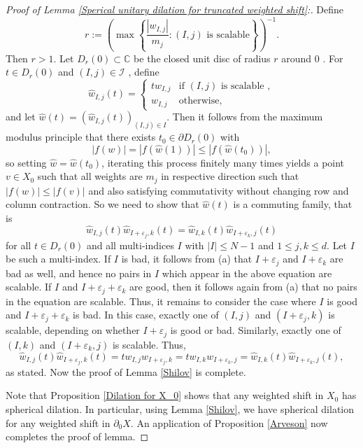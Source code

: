 \documentclass[10pt,a4paper]{amsart}
\begin{document}
\begin{proof}[Proof of Lemma \ref{Sperical unitary dilation for truncated weighted shift}:]
Define \[
r := \left( 
\max \left\{ 
\frac{|w_{I,j}|}{m_j} :  (I, j) \text{ is scalable} 
\right\}
\right)^{-1}.
\]
Then \( r> 1\).  Let \( D_r(0) \subset \mathbb{C}\) be the  closed unit disc of radius \(r\)  around 0 . For \(t\in D_r(0)\) and \( 
(I,j)\in \mathcal{I} \) , define 
\[
\hat{w}_{I,j}(t) = 
\begin{cases}
t w_{I,j} & \text{if } (I,j) \text{ is scalable }, \\
w_{I,j} & \text{otherwise},
\end{cases}
\]
and let \( \hat{w}(t) = (\hat{w}_{I,j}(t))_{(I,j) \in I} \). Then it follows from the maximum modulus principle that there exists \( t_0 \in \partial D_r(0) \) with
\[
|f(w)| = |f(\hat{w}(1))| \leq |f(\hat{w}(t_0))|,\] so setting \( \hat{w} = \hat{w}(t_0) \), iterating this process finitely many times yields a point \( v \in {X_0} \) such that all  weights are  \(m_j\) in respective direction  such that \( |f(w)| \leq |f(v)| \) and also satisfying commutativity without changing row and column contraction. So we need to show that \( \hat{w}(t) \) is a commuting family, that is
\[
\hat{w}_{I,j}(t) \hat{w}_{I+\varepsilon_j,k}(t) = \hat{w}_{I,k}(t) \hat{w}_{I+\varepsilon_k,j}(t)
\]
for all \( t \in D_r(0) \) and all multi-indices \( I \) with \( |I| \leq N-1 \) and \( 1 \leq j, k \leq d \).
Let \( I \) be such a multi-index. If \( I \) is bad, it follows from (a) that \( I + \varepsilon_j \) and \( I + \varepsilon_k \) are bad as well, and hence no pairs in \( I \) which appear in the above equation are scalable. If \( I \) and \( I + \varepsilon_j + \varepsilon_k \) are good, then it follows again from (a) that no pairs in the equation are scalable. Thus, it remains to consider the case where \( I \) is good and \( I + \varepsilon_j + \varepsilon_k \) is bad. In this case, exactly one of \( (I,j) \) and \( (I + \varepsilon_j, k) \) is scalable, depending on whether \( I + \varepsilon_j \) is good or bad. Similarly, exactly one of \( (I,k) \) and \( (I + \varepsilon_k, j) \) is scalable. Thus,
\[\hat{w}_{I,j}(t) \hat{w}_{I+\varepsilon_j,k}(t) = t w_{I,j} w_{I+\varepsilon_j,k} = t w_{I,k} w_{I+\varepsilon_k,j} = \hat{w}_{I,k}(t) \hat{w}_{I+\varepsilon_k,j}(t),
\]
as stated. 
Now the proof of Lemma \ref{Shilov} is complete.

Note that Proposition \ref{Dilation for X_0} shows that any weighted shift in $X_0$ has spherical dilation. In particular, using Lemma \ref{Shilov}, we have spherical dilation for any weighted shift in $\partial_0 X.$ An application of Proposition \ref{Arveson} now completes the proof of lemma.
\end{proof}
\end{document}
